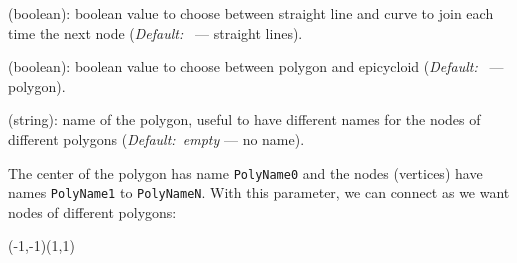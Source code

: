 \documentclass[11pt,english,BCOR10mm,DIV12,bibliography=totoc,parskip=false,smallheadings
    headexclude,footexclude,oneside]{pst-doc}
\begin{document}
\begin{compactdesc}
\bigskip
\begin{LTXexample}[pos=t]
  \PstPolygon
  \PstPolygon[PolyIntermediatePoint=0.38]
  \PstPolygon[PolyIntermediatePoint=0.2]
  \PstPolygon[PolyIntermediatePoint=1.2]
  \PstPolygon[PolyNbSides=7,PolyOffset=2,
              PolyIntermediatePoint=0.38]
  \PstPolygon[PolyNbSides=21,PolyOffset=2,
              PolyIntermediatePoint=-1.25]
\end{LTXexample}

\bigskip
  \item [\Lkeyword{PolyCurves}] (boolean): boolean value to choose between straight
  line and curve to join each time the next node (\emph{Default:~\false} --- straight lines).

\bigskip
\begin{LTXexample}[pos=t]
  \PstPolygon[PolyNbSides=7,PolyIntermediatePoint=0.38]\hfill
  \PstPolygon[PolyNbSides=11,PolyIntermediatePoint=0.6]\hfill
  \PstPolygon[PolyNbSides=7,PolyIntermediatePoint=0.2,
              PolyOffset=2]\hfill
  \PstPolygon[PolyNbSides=9,PolyIntermediatePoint=0.1]\hfill
  \PstPolygon[PolyNbSides=15,PolyIntermediatePoint=1.2]
\end{LTXexample}

\bigskip
  \item [\Lkeyword{PolyEpicycloid}] (boolean): boolean value to choose between
  polygon and epicycloid (\emph{Default:~\false} --- polygon).

\bigskip
\begin{LTXexample}[pos=t]
  \PstPolygon[PolyOffset=72]\hfill%
  \PstPolygon[PolyOffset=73]      %
\end{LTXexample}

\bigskip
  \item [\Lkeyword{PolyName}] (string): name of the polygon, useful to have different
  names for the nodes of different polygons (\emph{Default:~empty} --- no name).

  The center of the polygon has name \texttt{PolyName0} and the nodes
(vertices) have names \texttt{PolyName1} to \texttt{PolyNameN}.
  With this parameter, we can connect as we want nodes of different polygons:

\bigskip
\begin{LTXexample}[pos=l,width=0.3\linewidth,pos=l]
  \begin{pspicture}(-1,-1)(1,1)
    \PstPolygon[unit=0.8,PolyName=A,PolyNbSides=6]
    \PstPolygon[unit=1.2,PolyName=B,PolyNbSides=12]
  \end{pspicture}
\end{LTXexample}


\end{compactdesc}
\end{document}
